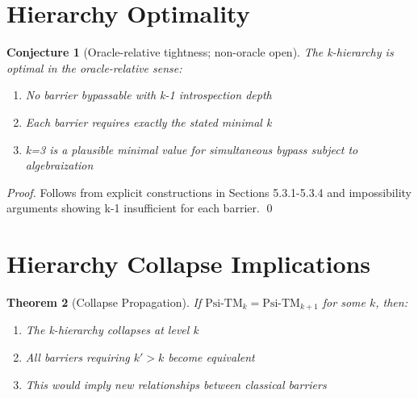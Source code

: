 \documentclass[11pt]{article}
\newtheorem{theorem}{Theorem}[section]
\theoremstyle{plain}
\newtheorem{conjecture}[theorem]{Conjecture}
\theoremstyle{definition}
\begin{document}
\section{Hierarchy Optimality}
\begin{conjecture}[Oracle-relative tightness; non-oracle open]
The k-hierarchy is optimal in the oracle-relative sense:
\begin{enumerate}
\item No barrier bypassable with k-1 introspection depth
\item Each barrier requires exactly the stated minimal k
\item k=3 is a plausible minimal value for simultaneous bypass subject to algebraization
\end{enumerate}
\end{conjecture}
\begin{proof}
Follows from explicit constructions in Sections 5.3.1-5.3.4 and 
impossibility arguments showing k-1 insufficient for each barrier. \qed
\end{proof}

\section{Hierarchy Collapse Implications}

\begin{theorem}[Collapse Propagation]
If $\text{Psi-TM}_k = \text{Psi-TM}_{k+1}$ for some $k$, then:
\begin{enumerate}
\item The k-hierarchy collapses at level k
\item All barriers requiring $k' > k$ become equivalent
\item This would imply new relationships between classical barriers
\end{enumerate}
\end{theorem}
\end{document}
